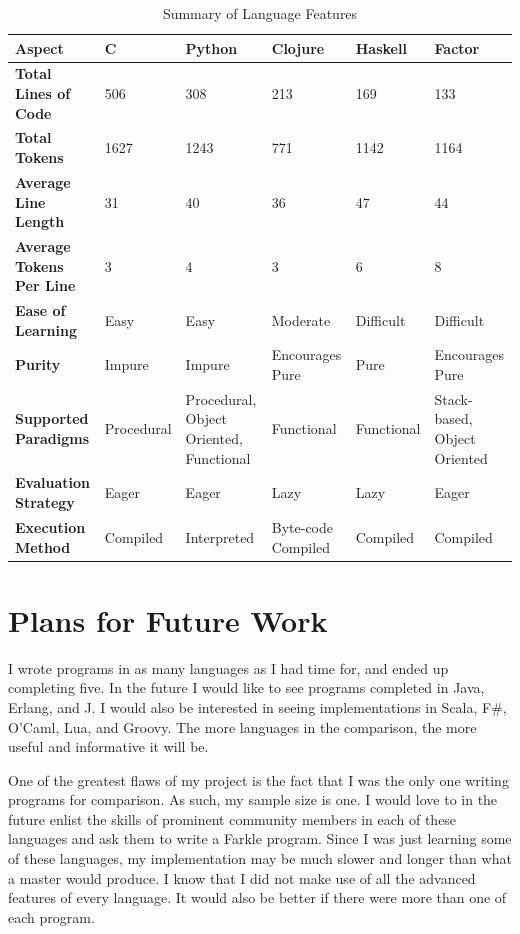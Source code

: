 \documentclass{article}
\begin{document}
\begin{table}[h]
    \caption{Summary of Language Features}
    \begin{tabular}{|p{0.7in}|p{0.7in}|p{0.7in}|p{0.7in}|p{0.7in}|p{0.7in}|}
        \hline
        {\bf Aspect} & {\bf C} & {\bf Python} & {\bf Clojure} & {\bf Haskell} & {\bf Factor} \\
        \hline
        {\bf Total Lines of Code} & 506 & 308 & 213 & 169 & 133 \\
        \hline
        {\bf Total Tokens} & 1627 & 1243 & 771 & 1142 & 1164 \\
        \hline
        {\bf Average Line Length} & 31 & 40 & 36 & 47 & 44 \\
        \hline
        {\bf Average Tokens Per Line} & 3 & 4 & 3 & 6 & 8 \\
        \hline
        {\bf Ease of Learning} & Easy & Easy & Moderate & Difficult & Difficult \\
        \hline
        {\bf Purity} & Impure & Impure & Encourages Pure & Pure & Encourages Pure \\
        \hline
        {\bf Supported Paradigms} & Procedural & Procedural, Object Oriented, Functional & Functional & Functional & Stack-based, Object Oriented \\
        \hline
        {\bf Evaluation Strategy} & Eager & Eager & Lazy & Lazy & Eager \\
        \hline
        {\bf Execution Method} & Compiled & Interpreted & Byte-code Compiled & Compiled & Compiled \\
        \hline
    \end{tabular}
\end{table}

\section{Plans for Future Work}

I wrote programs in as many languages as I had time for, and ended up completing
five.  In the future I would like to see programs completed in Java,
Erlang, and J.  I would also be interested in seeing implementations in Scala,
F\#, O'Caml, Lua, and Groovy.  The more languages in the comparison, the more
useful and informative it will be.

One of the greatest flaws of my project is the fact that I was the only one
writing programs for comparison.  As such, my sample size is one.  I would love
to in the future enlist the skills of prominent community members in each of
these languages and ask them to write a Farkle program.  Since I was just
learning some of these languages, my implementation may be much slower and
longer than what a master would produce.  I know that I did not make use of all
the advanced features of every language.  It would also be better if there were
more than one of each program.
\end{document}
